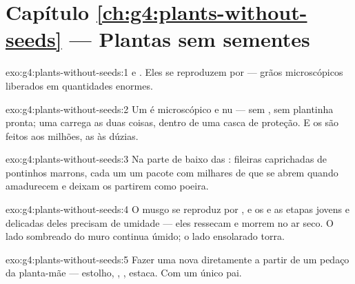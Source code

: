 \section*{Capítulo \ref{ch:g4:plants-without-seeds} --- Plantas sem sementes}

\begin{solution}{exo:g4:plants-without-seeds:1}
 e . Eles se reproduzem por  --- grãos
microscópicos liberados em quantidades enormes.
\end{solution}

\begin{solution}{exo:g4:plants-without-seeds:2}
Um  é microscópico e nu --- sem , sem
plantinha pronta; uma  carrega as duas coisas, dentro de uma
casca de proteção. E os  são feitos aos milhões, as 
às dúzias.
\end{solution}

\begin{solution}{exo:g4:plants-without-seeds:3}
Na parte de baixo das : fileiras caprichadas de pontinhos
marrons, cada um um pacote com milhares de  que se abrem
quando amadurecem e deixam os  partirem como poeira.
\end{solution}

\begin{solution}{exo:g4:plants-without-seeds:4}
O musgo se reproduz por , e os  e as etapas jovens e
delicadas deles precisam de umidade --- eles ressecam e morrem no ar
seco. O lado sombreado do muro continua úmido; o lado ensolarado torra.
\end{solution}

\begin{solution}{exo:g4:plants-without-seeds:5}
Fazer uma  nova diretamente a partir de um pedaço da
planta-mãe --- estolho, , , estaca. Com um único pai.
\end{solution}

